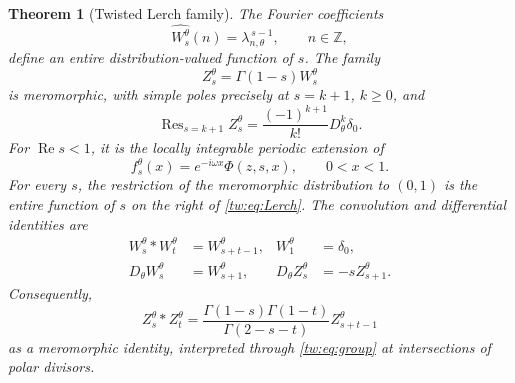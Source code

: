 \documentclass[11pt,letterpaper]{article}
\numberwithin{equation}{section}
\theoremstyle{plain}
\newtheorem{theorem}{Theorem}[section]
\theoremstyle{definition}
\theoremstyle{remark}
\begin{document}
\begin{theorem}[Twisted Lerch family]\label{tw:thm:family}
The Fourier coefficients
\begin{equation}\label{tw:eq:W}
 \widehat{W_s^\theta}(n)=\lambda_{n,\theta}^{\,s-1},
 \qquad n\in\mathbb Z,
\end{equation}
define an entire distribution-valued function of $s$. The family
\begin{equation}\label{tw:eq:Z}
 Z_s^\theta=\Gamma(1-s)W_s^\theta
\end{equation}
is meromorphic, with simple poles precisely at $s=k+1$, $k\ge0$, and
\begin{equation}\label{tw:eq:residues}
 \operatorname{Res}_{s=k+1}Z_s^\theta
       =\frac{(-1)^{k+1}}{k!}D_\theta^k\delta_0.
\end{equation}
For $\operatorname{Re}s<1$, it is the locally integrable periodic
extension of
\begin{equation}\label{tw:eq:Lerch}
 f_s^\theta(x)=e^{-i\omega x}\Phi(z,s,x),\qquad 0<x<1.
\end{equation}
For every $s$, the restriction of the meromorphic distribution to
$(0,1)$ is the entire function of $s$ on the right of
\eqref{tw:eq:Lerch}. The convolution and differential identities are
\begin{align}
 W_s^\theta*W_t^\theta&=W_{s+t-1}^\theta,
 &W_1^\theta&=\delta_0,\label{tw:eq:group}\\
 D_\theta W_s^\theta&=W_{s+1}^\theta,
 &D_\theta Z_s^\theta&=-s Z_{s+1}^\theta.\label{tw:eq:derivative}
\end{align}
Consequently,
\begin{equation}\label{tw:eq:Zconv}
 Z_s^\theta*Z_t^\theta
 =\frac{\Gamma(1-s)\Gamma(1-t)}{\Gamma(2-s-t)}
                           Z_{s+t-1}^\theta
\end{equation}
as a meromorphic identity, interpreted through \eqref{tw:eq:group} at
intersections of polar divisors.
\end{theorem}
\end{document}
